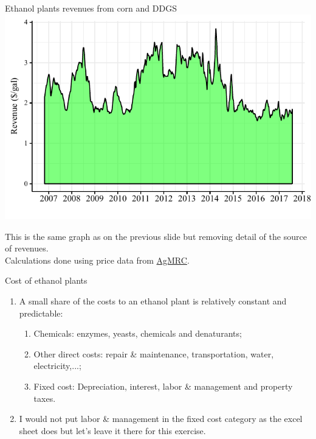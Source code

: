 \documentclass[table,xcolor=pdftex,dvipsnames]{beamer}\usepackage[]{graphicx}\usepackage[]{color}
\makeatletter
\def\maxwidth{ %
  \ifdim\Gin@nat@width>\linewidth
    \linewidth
  \else
    \Gin@nat@width
  \fi
}
\newenvironment{knitrout}{}{} %
\makeatother
\begin{document}

\begin{frame}{Ethanol plants revenues from corn and DDGS}
\begin{knitrout}
\color{fgcolor}
\includegraphics[width=\maxwidth]{figure/figure_rev-1} 

\end{knitrout}
\vspace{-1\baselineskip}
\scriptsize
This is the same graph as on the previous slide but removing detail of the source of revenues.\\
Calculations done using price data from \href{http://www.extension.iastate.edu/agdm/energy/xls/agmrcethanolplantprices.xlsx}{AgMRC}.
\end{frame}


\begin{frame}{Cost of ethanol plants}
\begin{enumerate}[label=\textbullet]
    \item A small share of the costs to an ethanol plant is relatively constant and predictable:
    \begin{enumerate}[label=-]
        \item Chemicals: enzymes, yeasts, chemicals and denaturants;
        \item Other direct costs: repair \& maintenance, transportation, water, electricity,...;
        \item Fixed cost: Depreciation, interest, labor \& management and property taxes.
    \end{enumerate}
    \item I would not put labor \& management in the fixed cost category as the excel sheet does but let's leave it there for this exercise.
\end{enumerate}
\end{frame}
\end{document}
